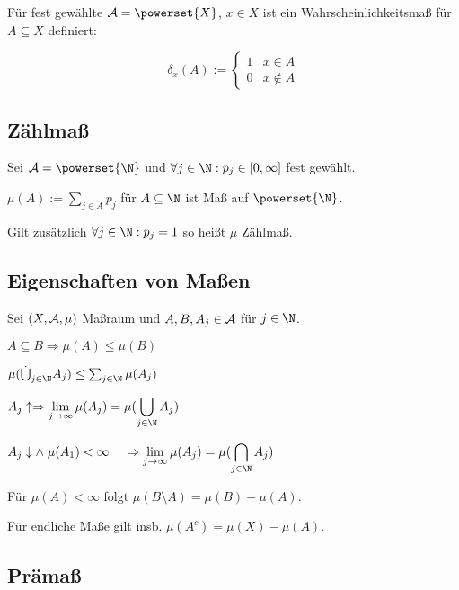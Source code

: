 Für fest gewählte $\A = \powerset{X}$, $x \in X$ ist ein Wahrscheinlichkeitsmaß für $A \subseteq X$ definiert:

\vspace{-2mm}
$$\delta_x(A) := \begin{cases}
	1 & x \in A \\
	0 & x \notin A
\end{cases}$$

\subsection*{Zählmaß}

Sei $\A = \powerset{\N}$ und $\forall j \in \N : p_j \in [0, \infty]$ fest gewählt.

$\mu(A) := \sum_{j\in A} p_j$ für $A \subseteq \N$ ist Maß auf $\powerset{\N}$.

Gilt zusätzlich $\forall j \in \N : p_j = 1$ so heißt $\mu$ Zählmaß.

\subsection*{Eigenschaften von Maßen}

Sei $(X, \mathcal{A}, \mu)$ Maßraum und $A, B, A_j \in \mathcal{A}$ für $j \in \N$.

\begin{description}[leftmargin=!,labelwidth=26mm]
	\item[Monotonie] $A \subseteq B \Rightarrow \mu(A) \leq \mu(B)$
	\item[$\sigma$-Subadditivität] $\mu(\dot\bigcup_{j\in \N} A_j) \leq \sum_{j\in \N} \mu(A_j)$
	\item[Stetigkeit (unten)] $A_j \uparrow \Rightarrow \displaystyle\lim_{j\to \infty} \mu(A_j) = \mu(\bigcup_{j\in \N} A_j)$
	\item[Stetigkeit (oben)] $A_j \downarrow \land \hspace*{1mm} \mu(A_1) < \infty \\ \hspace*{4mm}\Rightarrow \displaystyle\lim_{j\to \infty} \mu(A_j) = \mu(\bigcap_{j\in \N} A_j)$
\end{description}

Für $\mu(A) < \infty$ folgt $\mu(B\setminus A) = \mu(B) - \mu(A)$.

Für endliche Maße gilt insb. $\mu(A^c) = \mu(X) - \mu(A)$.

\subsection*{Prämaß}

